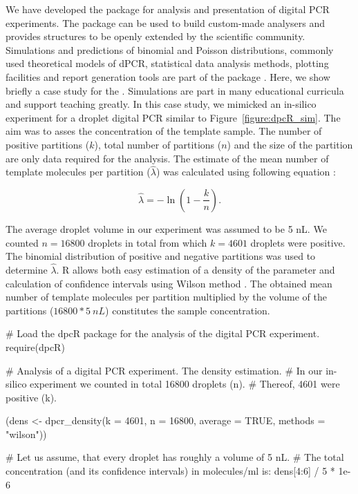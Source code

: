 We have developed the  package for analysis and presentation of 
digital PCR experiments. The  package can be used to build 
custom-made analysers and provides structures to be openly extended by the 
scientific community. Simulations and predictions of binomial and Poisson 
distributions, commonly used theoretical models of dPCR, statistical data 
analysis methods, plotting facilities and report generation tools are part of 
the package \citep{pabinger_2014}. Here, we show briefly a case study for the 
. Simulations are part in many educational curricula and support 
teaching greatly. In this case study, we mimicked an in-silico experiment for a 
droplet digital PCR similar to Figure~\ref{figure:dpcR_sim}. The aim was to 
asses the concentration of the template sample. The number of positive 
partitions ($k$), total number of partitions ($n$) and the size of the partition 
are only data required for the analysis. The estimate of the mean number of 
template molecules per partition ($\hat \lambda$) was calculated using following 
equation \citep{huggett_2013}:

\begin{equation}
\hat{\lambda} =  -\ln{(1 - \frac{k}{n})}.
\end{equation}

The average droplet volume in our experiment was assumed to be 5 nL. We counted 
$n = 16800$ droplets in total from which $k = 4601$ droplets were positive. The 
binomial distribution of positive and negative partitions was used to determine 
$\hat \lambda$. R allows both easy estimation of a density of the parameter and 
calculation of confidence intervals using Wilson method \citep{brown_2001}. The 
obtained mean number of template molecules per partition multiplied by the 
volume of the partitions ($ 16800 * 5~nL$) constitutes the sample concentration.

\begin{example}
# Load the dpcR package for the analysis of the digital PCR experiment.
require(dpcR)

# Analysis of a digital PCR experiment. The density estimation.
# In our in-silico experiment we counted in total 16800 droplets (n). 
# Thereof, 4601 were positive (k).

(dens <- dpcr_density(k = 4601, n = 16800, average = TRUE, methods = "wilson"))

# Let us assume, that every droplet has roughly a volume of 5 nL.
# The total concentration (and its confidence intervals) in molecules/ml is:
dens[4:6] / 5 * 1e-6
\end{example}

